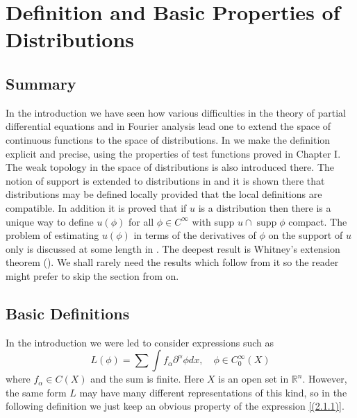 
\chapter{Definition and Basic Properties of Distributions}
\section*{Summary}
In the introduction we have seen how various difficulties in the theory of partial differential equations and in Fourier analysis lead one to extend the space of continuous functions to the space of distributions. In  we make the definition explicit and precise, using the properties of test functions proved in Chapter I. The weak topology in the space of distributions is also introduced there. The notion of support is extended to distributions in  and it is shown there that distributions may be defined locally provided that the local definitions are compatible. In addition it is proved that if $u$ is a distribution then there is a unique way to define $u(\phi)$ for all $\phi \in C^{\infty}$ with supp $u \cap \operatorname{supp} \phi$ compact. The problem of estimating $u(\phi)$ in terms of the derivatives of $\phi$ on the support of $u$ only is discussed at some length in . The deepest result is Whitney's extension theorem (). We shall rarely need the results which follow from it so the reader might prefer to skip the section from  on.

\section{Basic Definitions}
In the introduction we were led to consider expressions such as 
\begin{equation}
    \label{(2.1.1)}
L(\phi)=\sum \int f_{\alpha} \partial^{\alpha} \phi d x, \quad \phi \in C_{0}^{\infty}(X)
\end{equation}
where $f_{\alpha} \in C(X)$ and the sum is finite. Here $X$ is an open set in $\mathbb{R}^{n}$. However, the same form $L$ may have many different representations of this kind, so in the following definition we just keep an obvious property of the expression \eqref{(2.1.1)}.

